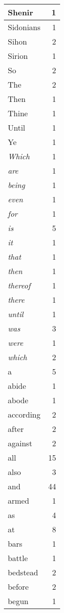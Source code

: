 \begin{center}
\begin{longtable}{l|r}
Shenir & 1 \\ \hline
Sidonians & 1 \\ \hline
Sihon & 2 \\ \hline
Sirion & 1 \\ \hline
So & 2 \\ \hline
The & 2 \\ \hline
Then & 1 \\ \hline
Thine & 1 \\ \hline
Until & 1 \\ \hline
Ye & 1 \\ \hline
\emph{Which} & 1 \\ \hline
\emph{are} & 1 \\ \hline
\emph{being} & 1 \\ \hline
\emph{even} & 1 \\ \hline
\emph{for} & 1 \\ \hline
\emph{is} & 5 \\ \hline
\emph{it} & 1 \\ \hline
\emph{that} & 1 \\ \hline
\emph{then} & 1 \\ \hline
\emph{thereof} & 1 \\ \hline
\emph{there} & 1 \\ \hline
\emph{until} & 1 \\ \hline
\emph{was} & 3 \\ \hline
\emph{were} & 1 \\ \hline
\emph{which} & 2 \\ \hline
a & 5 \\ \hline
abide & 1 \\ \hline
abode & 1 \\ \hline
according & 2 \\ \hline
after & 2 \\ \hline
against & 2 \\ \hline
all & 15 \\ \hline
also & 3 \\ \hline
and & 44 \\ \hline
armed & 1 \\ \hline
as & 4 \\ \hline
at & 8 \\ \hline
bars & 1 \\ \hline
battle & 1 \\ \hline
bedstead & 2 \\ \hline
before & 2 \\ \hline
begun & 1 \\ \hline

\end{longtable}
\end{center}
